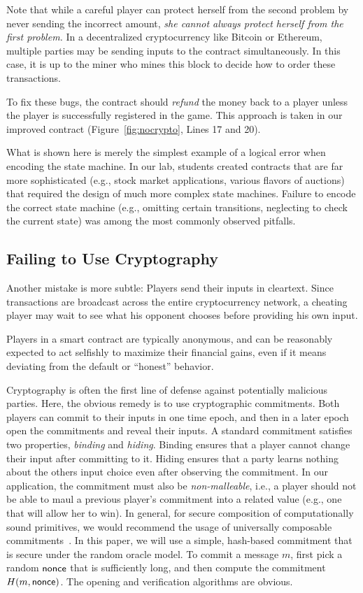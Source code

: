 \documentclass{llncs}
\newcommand{\elaine}[1]{}
\begin{document}
Note that while a careful player 
can protect herself from the second problem by never sending the incorrect amount,
{\it she cannot always protect 
herself from the first problem.}
In a decentralized cryptocurrency
like Bitcoin or Ethereum, 
multiple parties may be sending inputs 
to the contract simultaneously.
In this case, it is up to the miner who mines this block
to decide how to order these transactions.

To fix these bugs, the contract
should \emph{refund} the money back to
a player unless the player is successfully registered in the game.
This approach is taken in our improved contract (Figure~\ref{fig:nocrypto}, Lines 17 and 20).


What is shown here is merely the simplest example 
of a logical error when encoding the state machine.
In our lab, students created contracts that are far more
sophisticated (e.g., stock market 
applications, various flavors of auctions)
that required the design of much more 
complex state machines.
Failure to encode the correct state machine (e.g., 
omitting certain transitions, neglecting
to check the current state)  
was among the most commonly observed pitfalls. 


\subsection{Failing to Use Cryptography}
Another mistake is more subtle:
Players
send their inputs in cleartext. Since transactions are broadcast across the entire cryptocurrency network, a cheating player may wait to see what his opponent chooses before providing his own input.

Players in a smart contract are typically anonymous, and can be reasonably expected to act selfishly to maximize their financial gains, even if it means deviating from the default or ``honest'' behavior.

Cryptography is often the first line of defense against potentially malicious parties. 
Here, the obvious remedy is to use
cryptographic commitments.
Both players can commit to their inputs in one time epoch,
and then in a later epoch open the commitments and reveal their inputs.
A standard commitment satisfies two properties, {\it binding} and {\it hiding}.
Binding ensures that a player cannot change their input
after committing to it. Hiding ensures
that a party learns nothing about the others input choice even after observing the commitment.
In our application, the commitment must also be {\it non-malleable}, i.e.,  
a player should not be able to maul a previous player's commitment into  
a related value (e.g., one that will allow her to win). 
In general, for secure composition of computationally sound primitives, 
we would recommend the usage of universally composable commitments~\cite{uc,guc,juc}. 
In this paper, we will use a simple, hash-based commitment that is secure under the random oracle
model.
To commit a message $m$, first pick a random ${\sf nonce}$ that is sufficiently long,
and then compute the commitment $H(m, {\sf nonce})$. The opening and verification
algorithms are obvious.
\end{document}
